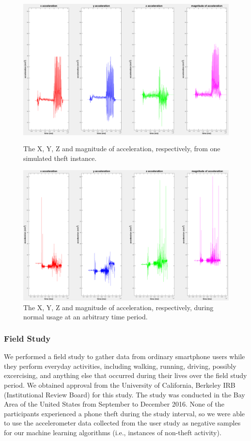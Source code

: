 \begin{figure}[t]
\includegraphics[width=1.0\columnwidth]{pos_acc_separated.png}
\caption{The X, Y, Z and magnitude of acceleration, respectively, from one simulated theft instance.}
\label{fig:simtheft}
\includegraphics[width=1.0\columnwidth]{neg_acc_separated.png}
\caption{The X, Y, Z and magnitude of acceleration, respectively, during normal usage at an arbitrary time period.}
\end{figure}




\subsubsection{Field Study}
We performed a field study to gather data from ordinary smartphone users while they perform everyday activities, including walking, running, driving, possibly excercising, and anything else that occurred during their lives over the field study period.
We obtained approval from the University of California, Berkeley IRB (Institutional Review Board) for this study.
The study was conducted in the Bay Area of the United States from September to December 2016.
None of the participants experienced a phone theft during the study interval,
so we were able to use the accelerometer data collected from the user study as negative samples for our machine learning algorithms (i.e., instances of non-theft activity).

